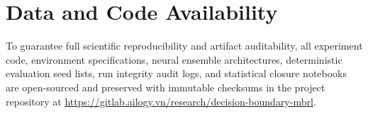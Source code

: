 \documentclass[journal,10pt,twocolumn]{IEEEtran}
\begin{document}
\section*{Data and Code Availability}
To guarantee full scientific reproducibility and artifact auditability, all experiment code, environment specifications, neural ensemble architectures, deterministic evaluation seed lists, run integrity audit logs, and statistical closure notebooks are open-sourced and preserved with immutable checksums in the project repository at \url{https://gitlab.ailogy.vn/research/decision-boundary-mbrl}.



\end{document}
